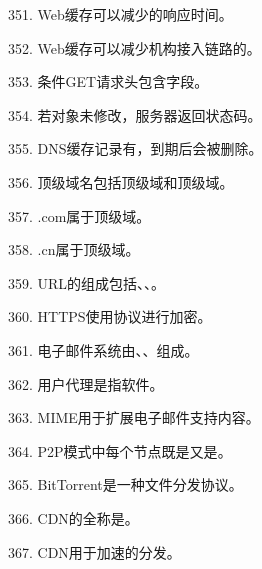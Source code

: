 351. Web缓存可以减少\underline{\hspace{2cm}}的响应时间。

352. Web缓存可以减少机构接入链路的\underline{\hspace{2cm}}。

353. 条件GET请求头包含\underline{\hspace{2cm}}字段。

354. 若对象未修改，服务器返回\underline{\hspace{2cm}}状态码。

355. DNS缓存记录有\underline{\hspace{2cm}}，到期后会被删除。

356. 顶级域名包括\underline{\hspace{2cm}}顶级域和\underline{\hspace{2cm}}顶级域。

357. .com属于\underline{\hspace{2cm}}顶级域。

358. .cn属于\underline{\hspace{2cm}}顶级域。

359. URL的组成包括\underline{\hspace{2cm}}、\underline{\hspace{2cm}}、\underline{\hspace{2cm}}。

360. HTTPS使用\underline{\hspace{2cm}}协议进行加密。

361. 电子邮件系统由\underline{\hspace{2cm}}、\underline{\hspace{2cm}}、\underline{\hspace{2cm}}组成。

362. 用户代理是指\underline{\hspace{2cm}}软件。

363. MIME用于扩展电子邮件支持\underline{\hspace{2cm}}内容。

364. P2P模式中每个节点既是\underline{\hspace{2cm}}又是\underline{\hspace{2cm}}。

365. BitTorrent是一种\underline{\hspace{2cm}}文件分发协议。

366. CDN的全称是\underline{\hspace{4cm}}。

367. CDN用于加速\underline{\hspace{2cm}}的分发。

